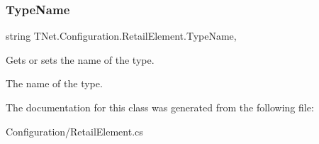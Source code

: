 \subsubsection{\texorpdfstring{Type\+Name}{TypeName}}
{\footnotesize\ttfamily string T\+Net.\+Configuration.\+Retail\+Element.\+Type\+Name\hspace{0.3cm}{\ttfamily [get]}, {\ttfamily [set]}}



Gets or sets the name of the type. 

The name of the type.

The documentation for this class was generated from the following file\+:\begin{DoxyCompactItemize}
\item 
Configuration/Retail\+Element.\+cs\end{DoxyCompactItemize}
